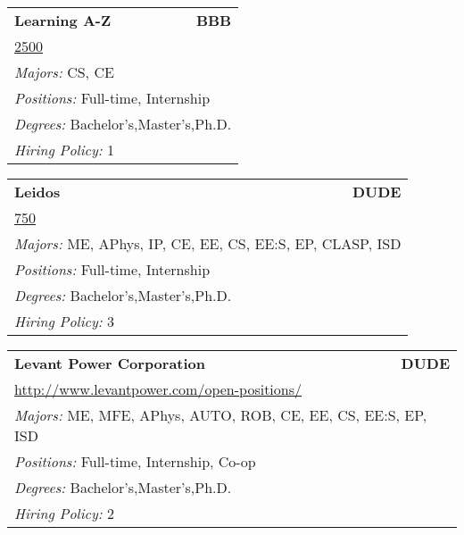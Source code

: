 \documentclass[twoside]{article}
\begin{document}
\begin{center}
\begin{multicols}{3}
\begin{FlushLeft}
\begin{minipage}{.9\columnwidth}
\end{minipage}
 
\begin{minipage}{.9\columnwidth}\begin{tabularx}{.95\columnwidth}{Xr}
                 {\Large\bf Learning A-Z} & {\Large\bf BBB}\\
    \multicolumn{2}{p{.95\columnwidth}}{\url{2500}}\\
    \multicolumn{2}{p{.95\columnwidth}}{\emph{Majors:} CS, CE}\\
    \multicolumn{2}{p{.95\columnwidth}}{\emph{Positions:} Full-time, Internship}\\
    \multicolumn{2}{p{.95\columnwidth}}{\emph{Degrees:} Bachelor's,Master's,Ph.D.}\\
    \multicolumn{2}{p{.95\columnwidth}}{\emph{Hiring Policy:} 1}\\
    \end{tabularx}
    
\end{minipage}
 
\begin{minipage}{.9\columnwidth}\begin{tabularx}{.95\columnwidth}{Xr}
                 {\Large\bf Leidos} & {\Large\bf DUDE}\\
    \multicolumn{2}{p{.95\columnwidth}}{\url{750}}\\
    \multicolumn{2}{p{.95\columnwidth}}{\emph{Majors:} ME, APhys, IP, CE, EE, CS, EE:S, EP, CLASP, ISD}\\
    \multicolumn{2}{p{.95\columnwidth}}{\emph{Positions:} Full-time, Internship}\\
    \multicolumn{2}{p{.95\columnwidth}}{\emph{Degrees:} Bachelor's,Master's,Ph.D.}\\
    \multicolumn{2}{p{.95\columnwidth}}{\emph{Hiring Policy:} 3}\\
    \end{tabularx}
    
\end{minipage}
 
\begin{minipage}{.9\columnwidth}\begin{tabularx}{.95\columnwidth}{Xr}
                 {\Large\bf Levant Power Corporation} & {\Large\bf DUDE}\\
    \multicolumn{2}{p{.95\columnwidth}}{\url{http://www.levantpower.com/open-positions/}}\\
    \multicolumn{2}{p{.95\columnwidth}}{\emph{Majors:} ME, MFE, APhys, AUTO, ROB, CE, EE, CS, EE:S, EP, ISD}\\
    \multicolumn{2}{p{.95\columnwidth}}{\emph{Positions:} Full-time, Internship, Co-op}\\
    \multicolumn{2}{p{.95\columnwidth}}{\emph{Degrees:} Bachelor's,Master's,Ph.D.}\\
    \multicolumn{2}{p{.95\columnwidth}}{\emph{Hiring Policy:} 2}\\
    \end{tabularx}
    

\end{minipage}
\end{FlushLeft}
\end{multicols}
\end{center}
\end{document}
